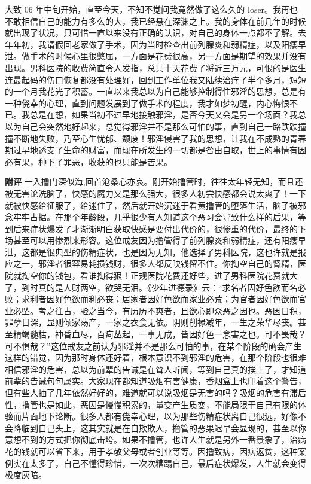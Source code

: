 \begin{case}
    大致 06 年中旬开始，直至今天，不知不觉间我竟然做了这么久的 loser。我再也不敢相信自己的能力有多么的大，我已经悬在深渊之上。我的身体在前几年的时候就出现了状况，只可惜一直以来没有正确的认识，对自己的身体一点都不了解。去年年初，我请假回老家做了手术，因为当时检查出前列腺炎和弱精症，以及阳痿早泄。做手术的时候心里很憋屈，一方面是花费很高，另一方面是期望的效果并没有出现。男科医院的收费简直令人发指，总共十天花费了将近三万元，可恨的是医生连最起码的伤口恢复都没有处理好，回到工作单位我又陆续治疗了半个多月，短短的一个月我花光了积蓄。一直以来我总以为自己能够控制得住邪淫的思想，总是有一种侥幸的心理，直到问题发展到了做手术的程度，我才如梦初醒，内心悔恨不已。我总是在想，如果当初不过早地接触邪淫，是否今天又会是另一个场面？我总以为自己会突然地好起来，总觉得邪淫并不是那么可怕的事，直到自己一路跌跌撞撞不断地失败，乃至心生忧郁、颓废！邪淫侵害了我的思想，让我在不成熟的青春期过早地透支了生命的财富，而现在所发生的一切都是咎由自取，世上的事情有因必有果，种下了罪恶，收获的也只能是苦果。

    \textbf{附评} 一入撸门深似海,回首沧桑心亦哀。刚开始撸管时，往往太年轻无知，而且还被无害论洗脑了，快感的魔力又是那么强大，很多人初尝快感都会说太爽了！一下就被快感给征服了，给迷住了，然后就开始沉迷于看黄撸管的堕落生活，脑子被邪念牢牢占据。在那个年龄段，几乎很少有人知道这个恶习会导致什么样的后果，等到后来症状爆发了才渐渐明白获取快感是要付出代价的，很惨重的代价，最终的下场甚至可以用惨烈来形容。这位戒友因为撸管得了前列腺炎和弱精症，还有阳痿早泄，这都是很典型的伤精症状，也是因为无知，他选择了男科医院，这也许就是报应之一，邪淫者很容易耗损钱财，很多人都反映钱留不住。你掏空自己的肾精，医院就掏空你的钱包，看谁掏得狠！正规医院花费还好些，进了男科医院花费就大了，到时真的是人财两空，欲哭无泪。《少年进德录》云：“求名者因好色欲而名必败；求利者因好色欲而利必丧；居家者因好色欲而家业必荒；为官者因好色欲而官业必坠。考之往古，验之当今，有历历不爽者，且欲心即众恶之因也。恶因日积，罪孽日深，显则倾家荡产，一家之衣食无依。阴则削禄减年，一生之荣华尽丧。甚至精竭髓枯，神昏血尽，百疴丛起，一事无成，皆因好色一念害之也。可不畏哉？可不惧哉？”这位戒友之前认为邪淫并不是那么可怕的事，在某个阶段的确会产生这样的错觉，因为那时身体还好着，根本意识不到邪淫的危害，在那个阶段也很难相信邪淫的危害，总以为前辈的告诫是在耸人听闻，等到自己真的挨上了，才知道前辈的告诫句句属实。大家现在都知道吸烟有害健康，香烟盒上也印着这个警告，但有些人抽了几年依然好好的，难道就可以说吸烟是无害的吗？吸烟的危害有滞后性，撸管也是如此，恶因是慢慢积累的，量变产生质变，不能局限于自己有限的体验而片面地下论断。很多人都有侥幸心理，以为那些伤精症状离自己很远，好像不会降临到自己头上，这其实就是在自欺欺人，撸管的恶果迟早会显现的，甚至以你意想不到的方式把你彻底击垮。如果不撸管，也许人生就是另外一番景象了，治病花的钱就可以省下来，用于孝敬父母或者创业等等。因撸致病，因病返贫，这种案例实在太多了，自己不懂得珍惜，一次次糟蹋自己，最后症状爆发，人生就会变得极度灰暗。
\end{case}

